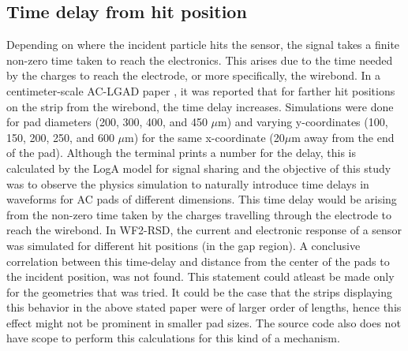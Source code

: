 \documentclass[11pt]{article}
\begin{document}
\subsection{Time delay from hit position}
Depending on where the incident particle hits the sensor, the signal takes a finite non-zero time taken to reach the electronics. This arises due to the time needed by the charges to reach the electrode, or more specifically, the wirebond. In a centimeter-scale AC-LGAD paper \cite{madrid2023}, it was reported that for farther hit positions on the strip from the wirebond, the time delay increases. Simulations were done for pad diameters (200, 300, 400, and 450 $\mu$m) and varying y-coordinates (100, 150, 200, 250, and 600 $\mu$m) for the same x-coordinate (20$\mu$m away from the end of the pad). Although the terminal prints a number for the delay, this is calculated by the LogA model for signal sharing and the objective of this study was to observe the physics simulation to naturally introduce time delays in waveforms for AC pads of different dimensions. This time delay would be arising from the non-zero time taken by the charges travelling through the electrode to reach the wirebond. In WF2-RSD, the current and electronic response of a sensor was simulated for different hit positions (in the gap region). A conclusive correlation between this time-delay and distance from the center of the pads to the incident position, was not found. This statement could atleast be made only for the geometries that was tried. It could be the case that the strips displaying this behavior in the above stated paper were of larger order of lengths, hence this effect might not be prominent in smaller pad sizes. The source code also does not have scope to perform this calculations for this kind of a mechanism.
\end{document}
